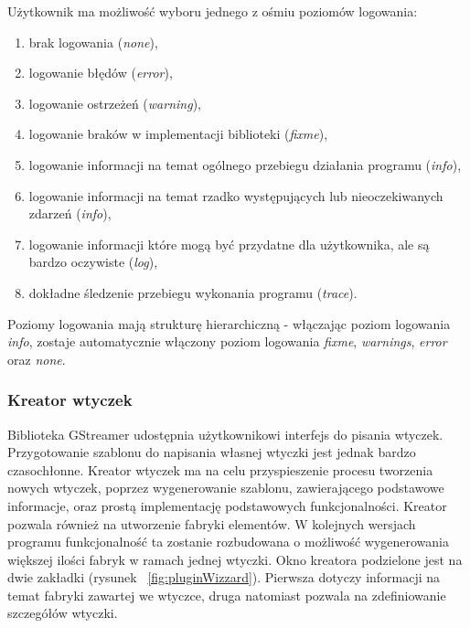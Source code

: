 \documentclass[12pt]{article}
\begin{document}
Użytkownik ma możliwość wyboru jednego z ośmiu poziomów logowania:
\begin{enumerate}
 \setlength{\itemsep}{0em}
\item brak logowania (\textit{none}),
\item logowanie błędów (\textit{error}),
\item logowanie ostrzeżeń (\textit{warning}),
\item logowanie braków w implementacji biblioteki (\textit{fixme}),
\item logowanie informacji na temat ogólnego przebiegu działania programu (\textit{info}),
\item logowanie informacji na temat rzadko występujących lub nieoczekiwanych zdarzeń (\textit{info}),
\item logowanie informacji które mogą być przydatne dla użytkownika, ale są bardzo oczywiste (\textit{log}),
\item dokładne śledzenie przebiegu wykonania programu (\textit{trace}).
\end{enumerate}
Poziomy logowania mają strukturę hierarchiczną - włączając poziom logowania \textit{info}, zostaje automatycznie włączony poziom logowania \textit{fixme}, \textit{warnings}, \textit{error} oraz \textit{none}.
\subsubsection{Kreator wtyczek}
Biblioteka GStreamer udostępnia użytkownikowi interfejs do pisania wtyczek. Przygotowanie szablonu do napisania własnej wtyczki jest jednak bardzo czasochłonne. Kreator wtyczek ma na celu przyspieszenie procesu tworzenia nowych wtyczek, poprzez wygenerowanie szablonu, zawierającego podstawowe informacje, oraz prostą implementację podstawowych funkcjonalności.
Kreator pozwala również na utworzenie fabryki elementów. W kolejnych wersjach programu funkcjonalność ta zostanie rozbudowana o możliwość wygenerowania większej ilości fabryk w ramach jednej wtyczki.
Okno kreatora podzielone jest na dwie zakładki (rysunek ~\ref{fig:pluginWizzard}). Pierwsza dotyczy informacji na temat fabryki zawartej we wtyczce, druga natomiast pozwala na zdefiniowanie szczegółów wtyczki.
\end{document}

